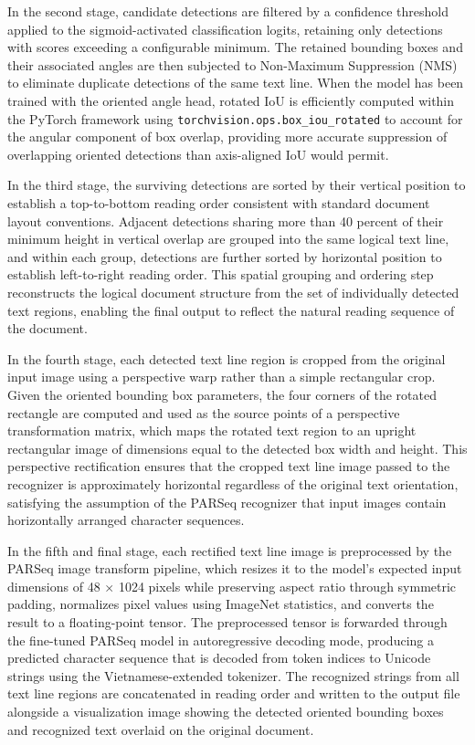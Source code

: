 In the second stage, candidate detections are filtered by a confidence threshold applied to the sigmoid-activated classification logits, retaining only detections with scores exceeding a configurable minimum. The retained bounding boxes and their associated angles are then subjected to Non-Maximum Suppression (NMS) to eliminate duplicate detections of the same text line. When the model has been trained with the oriented angle head, rotated IoU is efficiently computed within the PyTorch framework using \texttt{torchvision.ops.box\_iou\_rotated} to account for the angular component of box overlap, providing more accurate suppression of overlapping oriented detections than axis-aligned IoU would permit.

In the third stage, the surviving detections are sorted by their vertical position to establish a top-to-bottom reading order consistent with standard document layout conventions. Adjacent detections sharing more than 40 percent of their minimum height in vertical overlap are grouped into the same logical text line, and within each group, detections are further sorted by horizontal position to establish left-to-right reading order. This spatial grouping and ordering step reconstructs the logical document structure from the set of individually detected text regions, enabling the final output to reflect the natural reading sequence of the document.

In the fourth stage, each detected text line region is cropped from the original input image using a perspective warp rather than a simple rectangular crop. Given the oriented bounding box parameters, the four corners of the rotated rectangle are computed and used as the source points of a perspective transformation matrix, which maps the rotated text region to an upright rectangular image of dimensions equal to the detected box width and height. This perspective rectification ensures that the cropped text line image passed to the recognizer is approximately horizontal regardless of the original text orientation, satisfying the assumption of the PARSeq recognizer that input images contain horizontally arranged character sequences.

In the fifth and final stage, each rectified text line image is preprocessed by the PARSeq image transform pipeline, which resizes it to the model's expected input dimensions of 48 $\times$ 1024 pixels while preserving aspect ratio through symmetric padding, normalizes pixel values using ImageNet statistics, and converts the result to a floating-point tensor. The preprocessed tensor is forwarded through the fine-tuned PARSeq model in autoregressive decoding mode, producing a predicted character sequence that is decoded from token indices to Unicode strings using the Vietnamese-extended tokenizer. The recognized strings from all text line regions are concatenated in reading order and written to the output file alongside a visualization image showing the detected oriented bounding boxes and recognized text overlaid on the original document.

